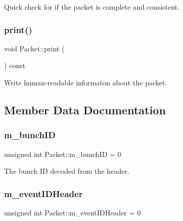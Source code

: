Quick check for if the packet is complete and consistent. 

\mbox{\label{class_packet_aec87fc2f2473111a694ad8b6f60e7666}} 
\subsubsection{\texorpdfstring{print()}{print()}}
{\footnotesize\ttfamily void Packet\+::print (\begin{DoxyParamCaption}{ }\end{DoxyParamCaption}) const}



Write human-\/readable informaton about the packet. 



\subsection{Member Data Documentation}
\mbox{\label{class_packet_ad0a2dce379a45ee0f899d495f5e760fc}} 
\subsubsection{\texorpdfstring{m\+\_\+bunch\+ID}{m\_bunchID}}
{\footnotesize\ttfamily unsigned int Packet\+::m\+\_\+bunch\+ID = 0\hspace{0.3cm}{\ttfamily [private]}}



The bunch ID decoded from the header. 

\mbox{\label{class_packet_a3abf93570be0669506f39b391bc574ca}} 
\subsubsection{\texorpdfstring{m\+\_\+event\+I\+D\+Header}{m\_eventIDHeader}}
{\footnotesize\ttfamily unsigned int Packet\+::m\+\_\+event\+I\+D\+Header = 0\hspace{0.3cm}{\ttfamily [private]}}



